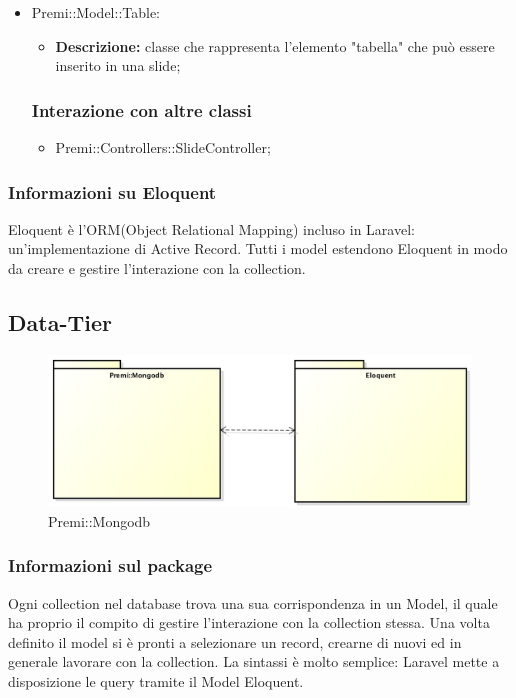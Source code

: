 \begin{itemize}
		\item Premi::Model::Table:
		\begin{itemize}
			\item \textbf{Descrizione:} classe che rappresenta l'elemento "tabella" che può essere inserito in una \gls{slide};
		\end{itemize}
		\subsubsection*{Interazione con altre classi}
		\begin{itemize}
			\item Premi::Controllers::SlideController;
		\end{itemize}
	\end{itemize}
	
\subsubsection*{Informazioni su Eloquent}
Eloquent è l'ORM(Object Relational Mapping) incluso in Laravel: un'implementazione di Active Record. Tutti i model estendono  Eloquent in modo da creare e gestire l'interazione con la collection.


\newpage
\subsection{Data-Tier}
\begin{figure}[h]
\centering
\includegraphics[width=0.7\linewidth]{img/premi_mongodb}
\caption[Premi::Mongodb]{Premi::Mongodb}
\label{fig:premi_mongodb}
\end{figure}
\subsubsection*{Informazioni sul package}
Ogni collection nel database trova una sua corrispondenza in un Model, il quale ha proprio il compito di gestire l'interazione con la collection stessa. Una volta definito il model si è pronti a selezionare un record, crearne di nuovi ed in generale lavorare con la collection. La sintassi è molto semplice: Laravel mette a disposizione le query tramite il Model Eloquent.
